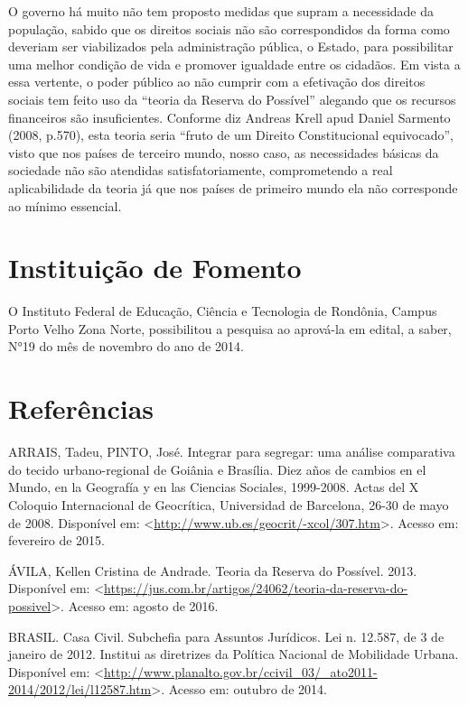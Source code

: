 \documentclass[article,12pt,onesidea,4paper,english,brazil]{abntex2}
\begin{document}
	O governo há muito não tem proposto medidas que supram a necessidade da população, sabido que os direitos sociais não são correspondidos da forma como deveriam ser viabilizados pela administração pública, o Estado, para possibilitar uma melhor condição de vida e promover igualdade entre os cidadãos. Em vista a essa vertente, o poder público ao não cumprir com a efetivação dos direitos sociais tem feito uso da “teoria da Reserva do Possível” alegando que os recursos financeiros são insuficientes. Conforme diz Andreas Krell apud Daniel Sarmento (2008, p.570), esta teoria seria “fruto de um Direito Constitucional equivocado”, visto que nos países de terceiro mundo, nosso caso, as necessidades básicas da sociedade não são atendidas satisfatoriamente, comprometendo a real aplicabilidade da teoria já que nos países de primeiro mundo ela não corresponde ao mínimo essencial.
	
	\section*{Instituição de Fomento}
	
	O Instituto Federal de Educação, Ciência e Tecnologia de Rondônia, Campus Porto Velho Zona Norte, possibilitou a pesquisa ao aprová-la em edital, a saber, N°19 do mês de novembro do ano de 2014.
	
	\section*{Referências}
	
	\sloppy
	
	\noindent ARRAIS, Tadeu, PINTO, José. Integrar para segregar: uma análise comparativa do tecido urbano-regional de Goiânia e Brasília. Diez años de cambios en el Mundo, en la Geografía y en las Ciencias Sociales, 1999-2008. Actas del X Coloquio Internacional de Geocrítica, Universidad de Barcelona, 26-30 de mayo de 2008. Disponível em: <\url{http://www.ub.es/geocrit/-xcol/307.htm}>. Acesso em: fevereiro de 2015.
	
	\noindent ÁVILA, Kellen Cristina de Andrade. Teoria da Reserva do Possível. 2013. Disponível em: <\url{https://jus.com.br/artigos/24062/teoria-da-reserva-do-possivel}>. Acesso em: agosto de 2016.
	
	\noindent BRASIL. Casa Civil. Subchefia para Assuntos Jurídicos. Lei n. 12.587, de 3 de janeiro de 2012. Institui as diretrizes da Política Nacional de Mobilidade Urbana.
	Disponível em: <\url{http://www.planalto.gov.br/ccivil\_03/\_ato2011- 2014/2012/lei/l12587.htm}>. Acesso em: outubro de 2014.
	
\end{document}

